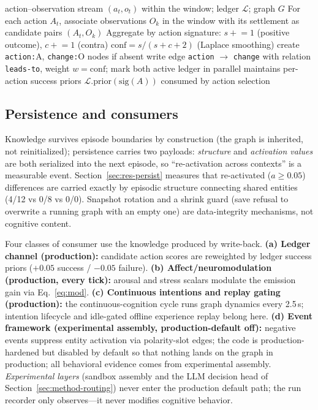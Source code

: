 \documentclass[10pt,a4paper]{article}
\begin{document}
\begin{algorithm}[t]
\caption{Attribution--write-back: experience to relational knowledge}\label{alg:wb}
\begin{algorithmic}[1]
\Require action--observation stream $(a_t,o_t)$ within the window; ledger $\mathcal{L}$; graph $G$
\State For each action $A_t$, associate observations $O_k$ in the window with its settlement as candidate pairs $(A_t,O_k)$
\State Aggregate by action signature: $s\mathrel{+}=1$ (positive outcome), $c\mathrel{+}=1$ (contra)
\State $\mathrm{conf}=s/(s+c+2)$ (Laplace smoothing)
  \State create \texttt{action:}A, \texttt{change:}O nodes if absent
  \State write edge \texttt{action} $\longrightarrow$ \texttt{change} with relation \texttt{leads-to}, weight $w{=}\mathrm{conf}$; mark both active
\EndIf
\State ledger in parallel maintains per-action success priors $\mathcal{L}.\mathrm{prior}(\mathrm{sig}(A))$ consumed by action selection
\end{algorithmic}
\end{algorithm}

\subsection{Persistence and consumers}
\label{sec:arch-persist}
Knowledge survives episode boundaries by construction (the graph is inherited, not reinitialized); persistence carries two payloads: \emph{structure} and \emph{activation values} are both serialized into the next episode, so ``re-activation across contexts'' is a measurable event. Section~\ref{sec:res-persist} measures that re-activated ($a\ge0.05$) differences are carried exactly by episodic structure connecting shared entities (4/12 vs 0/8 vs 0/0). Snapshot rotation and a shrink guard (save refusal to overwrite a running graph with an empty one) are data-integrity mechanisms, not cognitive content.

Four classes of consumer use the knowledge produced by write-back. \textbf{(a) Ledger channel (production):} candidate action scores are reweighted by ledger success priors ($+0.05$ success / $-0.05$ failure). \textbf{(b) Affect/neuromodulation (production, every tick):} arousal and stress scalars modulate the emission gain via Eq.~\ref{eq:mod}. \textbf{(c) Continuous intentions and replay gating (production):} the continuous-cognition cycle runs graph dynamics every 2.5\,s; intention lifecycle and idle-gated offline experience replay belong here. \textbf{(d) Event framework (experimental assembly, production-default off):} negative events suppress entity activation via polarity-slot edges; the code is production-hardened but disabled by default so that nothing lands on the graph in production; all behavioral evidence comes from experimental assembly. \emph{Experimental layers} (sandbox assembly and the LLM decision head of Section~\ref{sec:method-routing}) never enter the production default path; the run recorder only observes---it never modifies cognitive behavior.
\end{document}
